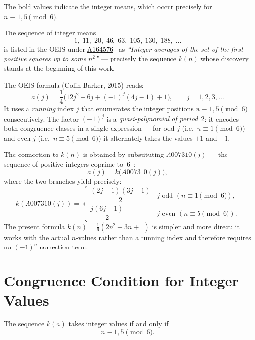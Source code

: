 The bold values indicate the integer means, which occur precisely for
$n \equiv 1, 5 \pmod{6}$.

\begin{remark}
	The sequence of integer means
	\[
	1,\; 11,\; 20,\; 46,\; 63,\; 105,\; 130,\; 188,\;\ldots
	\]
	is listed in the OEIS under \href{https://oeis.org/A164576}{A164576}~\cite{OEIS}
	as \emph{``Integer averages of the set of the first positive
		squares up to some $n^2$''} --- precisely the sequence $k(n)$ whose
	discovery stands at the beginning of this work.
	
	The OEIS formula (Colin Barker, 2015) reads:
	\[
	a(j) = \frac{1}{4}\bigl(12j^2 - 6j + (-1)^j(4j-1) + 1\bigr),
	\qquad j = 1, 2, 3, \ldots
	\]
	It uses a \emph{running} index $j$ that enumerates the integer
	positions $n \equiv 1, 5 \pmod{6}$ consecutively.
	The factor $(-1)^j$ is a \emph{quasi-polynomial of period~$2$}:
	it encodes both congruence classes in a single expression --- for
	odd $j$ (i.e.\ $n \equiv 1 \pmod{6}$) and even $j$
	(i.e.\ $n \equiv 5 \pmod{6}$) it alternately takes the values
	$+1$ and $-1$.
	
	The connection to $k(n)$ is obtained by substituting
	$A007310(j)$ --- the sequence of positive integers coprime
	to~$6$~\cite{OEIS}:
	\[
	a(j) = k\!\bigl(A007310(j)\bigr),
	\]
	where the two branches yield precisely:
	\[
	k(A007310(j)) =
	\begin{cases}
		\dfrac{(2j-1)(3j-1)}{2} & j \text{ odd } (n \equiv 1 \pmod{6}), \\[8pt]
		\dfrac{j(6j-1)}{2}      & j \text{ even }   (n \equiv 5 \pmod{6}).
	\end{cases}
	\]
	The present formula $k(n) = \tfrac{1}{6}(2n^2+3n+1)$
	is simpler and more direct: it works with the actual
	$n$-values rather than a running index and therefore requires
	no $(-1)^n$ correction term.
\end{remark}

\clearpage

\section{Congruence Condition for Integer Values}

\begin{theorem}
The sequence $k(n)$ takes integer values if and only if
\begin{equation}
n \equiv 1, 5 \pmod{6}.
\end{equation}
\end{theorem}

